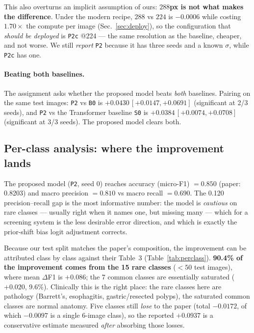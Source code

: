\documentclass[11pt,a4paper]{article}
\begin{document}
This also overturns an implicit assumption of ours: \textbf{$288$px is not what
makes the difference}. Under the modern recipe, $288$ vs $224$ is $-0.0006$
while costing $1.70\times$ the compute per image (Sec.~\ref{sec:deploy}), so the
configuration that \emph{should be deployed} is \texttt{P2c} @224 --- the same
resolution as the baseline, cheaper, and not worse. We still \emph{report}
\texttt{P2} because it has three seeds and a known $\sigma$, while \texttt{P2c}
has one.

\paragraph{Beating both baselines.}
The assignment asks whether the proposed model beats \emph{both} baselines.
Pairing on the same test images: \texttt{P2} vs \texttt{B0} is
$+0.0430\,[+0.0147,+0.0691]$ (significant at 2/3 seeds), and \texttt{P2} vs the
Transformer baseline \texttt{S0} is $+0.0384\,[+0.0074,+0.0708]$ (significant at
3/3 seeds). The proposed model clears both.

\subsection{Per-class analysis: where the improvement lands}
\label{sec:perclass}
The proposed model (\texttt{P2}, seed 0) reaches accuracy (micro-F1) $=0.850$
(paper: 0.8203) and macro precision $=0.810$ vs macro recall $=0.690$. The
0.120 precision--recall gap is the most informative number: the model is
\emph{cautious} on rare classes --- usually right when it names one, but missing
many --- which for a screening system is the less desirable error direction, and
which is exactly the prior-shift bias logit adjustment corrects.

Because our test split matches the paper's composition, the improvement can be
attributed class by class against their Table~3 (Table~\ref{tab:perclass}).
\textbf{90.4\% of the improvement comes from the 15 rare classes}
($<50$ test images), where mean $\Delta$F1 is $+0.086$; the 7 common classes are
essentially saturated ($+0.020$, 9.6\%). Clinically this is the right place: the
rare classes here are pathology (Barrett's, esophagitis, gastric/resected
polyps), the saturated common classes are normal anatomy. Five classes still
\emph{lose} to the paper (total $-0.0172$, of which $-0.0097$ is a single
6-image class), so the reported $+0.0937$ is a conservative estimate measured
\emph{after} absorbing those losses.
\end{document}

